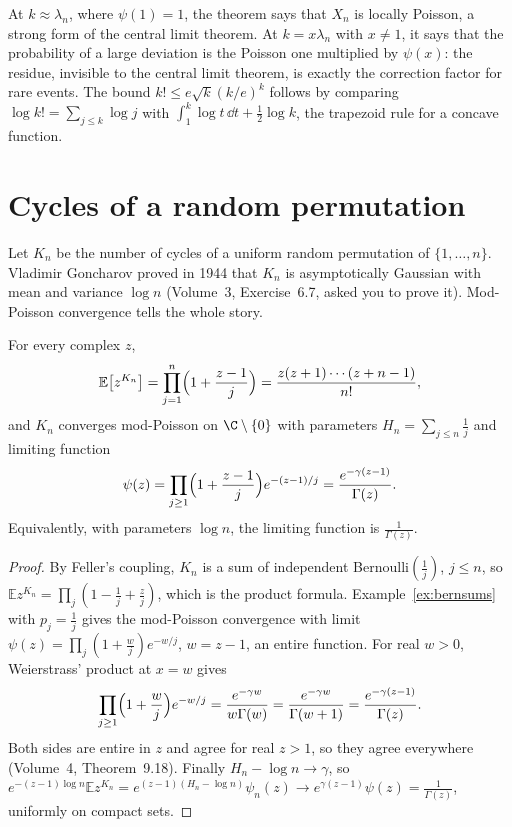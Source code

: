 At $k\approx\lambda_n$, where $\psi(1)=1$, the theorem says that $X_n$ is locally Poisson, a strong form of the central limit theorem. At $k=x\lambda_n$ with $x\neq1$, it says that the probability of a large deviation is the Poisson one
multiplied by $\psi(x)$: the residue, invisible to the central limit theorem, is exactly the correction factor for rare events. The bound $k!\le e\sqrt k(k/e)^k$ follows by comparing $\log k!=\sum_{j\le k}\log j$ with
$\int_1^k\log t\,\dd t+\frac12\log k$, the trapezoid rule for a concave function.

\section{Cycles of a random permutation}

Let $K_n$ be the number of cycles of a uniform random permutation of $\{1,\dots,n\}$. Vladimir Goncharov proved in 1944 that $K_n$ is asymptotically Gaussian with mean and variance $\log n$ (Volume~3, Exercise~6.7, asked you to prove it).
Mod-Poisson convergence tells the whole story.

\begin{theorem}\label{thm:cyclesmod}
For every complex $z$,
\[
\mathbb E\bigl[z^{K_n}\bigr]=\prod_{j=1}^n\Bigl(1+\frac{z-1}j\Bigr)=\frac{z(z+1)\cdots(z+n-1)}{n!},
\]
and $K_n$ converges mod-Poisson on $\C\setminus\{0\}$ with parameters $H_n=\sum_{j\le n}\frac1j$ and limiting function
\[
\psi(z)=\prod_{j\ge1}\Bigl(1+\frac{z-1}j\Bigr)e^{-(z-1)/j}=\frac{e^{-\gamma(z-1)}}{\Gamma(z)}.
\]
Equivalently, with parameters $\log n$, the limiting function is $\frac1{\Gamma(z)}$.
\end{theorem}
\begin{proof}
By Feller's coupling, $K_n$ is a sum of independent Bernoulli$(\frac1j)$, $j\le n$, so $\mathbb Ez^{K_n}=\prod_j(1-\frac1j+\frac zj)$, which is the product formula. Example~\ref{ex:bernsums} with $p_j=\frac1j$ gives the mod-Poisson
convergence with limit $\psi(z)=\prod_j(1+\frac wj)e^{-w/j}$, $w=z-1$, an entire function. For real $w>0$, Weierstrass' product at $x=w$ gives
\[
\prod_{j\ge1}\Bigl(1+\frac wj\Bigr)e^{-w/j}=\frac{e^{-\gamma w}}{w\Gamma(w)}=\frac{e^{-\gamma w}}{\Gamma(w+1)}=\frac{e^{-\gamma(z-1)}}{\Gamma(z)}.
\]
Both sides are entire in $z$ and agree for real $z>1$, so they agree everywhere (Volume~4, Theorem~9.18). Finally $H_n-\log n\to\gamma$, so $e^{-(z-1)\log n}\mathbb Ez^{K_n}=e^{(z-1)(H_n-\log n)}\psi_n(z)\to e^{\gamma(z-1)}\psi(z)=\frac1{\Gamma(z)}$, uniformly on compact sets.
\end{proof}

